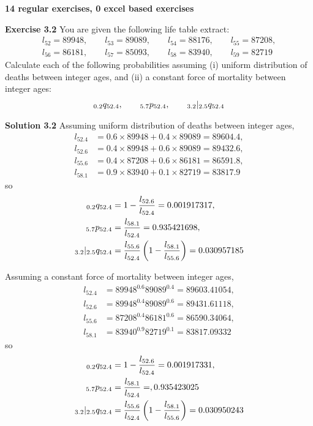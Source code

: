\documentclass[hidelinks, 12pt]{article}
\theoremstyle{mydefstyle}
\theoremstyle{mythmstyle}
\begin{document}
\textbf{14 regular exercises, 0 excel based exercises}

\textbf{Exercise 3.2} You are given the following life table extract:
\begin{gather*}
l_{52} = 89948, \qquad l_{53} = 89089, \qquad l_{54} = 88176, \qquad l_{55} = 87208, \\ 
l_{56} = 86181, \qquad l_{57} = 85093, \qquad l_{58} = 83940, \qquad l_{59} = 82719 
\end{gather*}
Calculate each of the following probabilities assuming (i) uniform distribution of deaths between integer ages, and (ii) a constant force of mortality between integer ages:
\begin{gather*}
\hspace{0mm}_{0.2}q_{52.4}, \qquad \hspace{0mm}_{5.7}p_{52.4}, \qquad \hspace{0mm}_{3.2}\vert_{2.5}q_{52.4}
\end{gather*}

\textbf{Solution 3.2} Assuming uniform distribution of deaths between integer ages,
\begin{align*}
l_{52.4} &= 0.6 \times 89948 + 0.4 \times 89089 = 89604.4, \\ 
l_{52.6} &= 0.4 \times 89948 + 0.6 \times 89089 = 89432.6, \\
l_{55.6} &= 0.4 \times 87208 + 0.6 \times 86181 = 86591.8, \\
l_{58.1} &= 0.9 \times 83940 + 0.1 \times 82719 = 83817.9
\end{align*}
so
\begin{align*}
\hspace{0mm}_{0.2}q_{52.4} &= 1 - \frac{l_{52.6}}{l_{52.4}} = 0.001917317, \\ 
\hspace{0mm}_{5.7}p_{52.4} &= \frac{l_{58.1}}{l_{52.4}} = 0.935421698, \\ 
\hspace{0mm}_{3.2}\vert_{2.5}q_{52.4} &= \frac{l_{55.6}}{l_{52.4}} \left(1 - \frac{l_{58.1}}{l_{55.6}}\right) = 0.030957185
\end{align*}

Assuming a constant force of mortality between integer ages, 
\begin{align*}
l_{52.4} &= 89948^{0.6} 89089^{0.4} = 89603.41054, \\
l_{52.6} &= 89948^{0.4} 89089^{0.6} = 89431.61118, \\
l_{55.6} &= 87208^{0.4} 86181^{0.6} = 86590.34064, \\
l_{58.1} &= 83940^{0.9} 82719^{0.1} = 83817.09332
\end{align*}
so
\begin{align*}
\hspace{0mm}_{0.2}q_{52.4} &= 1 - \frac{l_{52.6}}{l_{52.4}} = 0.001917331, \\ 
\hspace{0mm}_{5.7}p_{52.4} &= \frac{l_{58.1}}{l_{52.4}} = , 0.935423025 \\ 
\hspace{0mm}_{3.2}\vert_{2.5}q_{52.4} &= \frac{l_{55.6}}{l_{52.4}} \left(1 - \frac{l_{58.1}}{l_{55.6}}\right) = 0.030950243
\end{align*}
\end{document}
